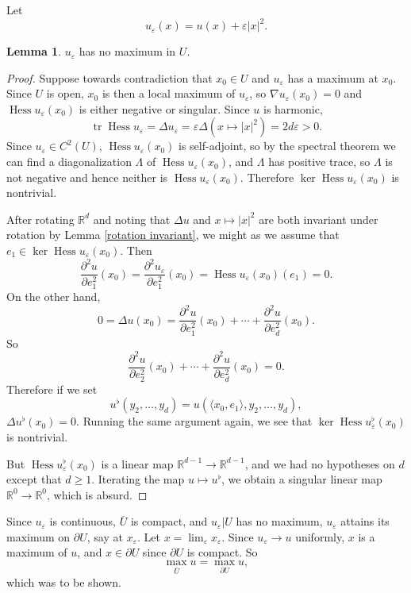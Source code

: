 \documentclass[10pt]{article}
\newcommand{\RR}{\mathbb{R}}
\newcommand{\Hess}{\operatorname{Hess}}
\DeclareMathOperator{\tr}{tr}
\theoremstyle{definition}
\newtheorem{lemma}{Lemma}[exer]
\begin{document}
Let
$$u_\varepsilon(x) = u(x) + \varepsilon|x|^2.$$
\begin{lemma}
$u_\varepsilon$ has no maximum in $U$.
\end{lemma}
\begin{proof}
Suppose towards contradiction that $x_0 \in U$ and $u_\varepsilon$ has a maximum at $x_0$.
Since $U$ is open, $x_0$ is then a local maximum of $u_\varepsilon$, so $\nabla u_\varepsilon(x_0) = 0$ and $\Hess u_\varepsilon(x_0)$ is either negative or singular.
Since $u$ is harmonic,
$$\tr \Hess u_\varepsilon = \Delta u_\varepsilon = \varepsilon \Delta (x \mapsto |x|^2) = 2d\varepsilon > 0.$$
Since $u_\varepsilon \in C^2(U)$, $\Hess u_\varepsilon(x_0)$ is self-adjoint, so by the spectral theorem we can find a diagonalization $\Lambda$ of $\Hess u_\varepsilon(x_0)$, and $\Lambda$ has positive trace, so $\Lambda$ is not negative and hence neither is $\Hess u_\varepsilon(x_0)$.
Therefore $\ker \Hess u_\varepsilon(x_0)$ is nontrivial.

After rotating $\RR^d$ and noting that $\Delta u$ and $x \mapsto |x|^2$ are both invariant under rotation by Lemma \ref{rotation invariant}, we might as we assume that $e_1 \in \ker \Hess u_\varepsilon(x_0)$. Then
$$\frac{\partial^2 u}{\partial e_1^2}(x_0) = \frac{\partial^2 u_\varepsilon}{\partial e_1^2}(x_0) = \Hess u_\varepsilon(x_0)(e_1) = 0.$$
On the other hand,
$$0 = \Delta u(x_0) = \frac{\partial^2 u}{\partial e_1^2}(x_0) + \cdots + \frac{\partial^2 u}{\partial e_d^2}(x_0).$$
So
$$\frac{\partial^2 u}{\partial e_2^2}(x_0) + \cdots + \frac{\partial^2 u}{\partial e_d^2}(x_0) = 0.$$
Therefore if we set
$$u^\flat(y_2, \dots, y_d) = u(\langle x_0, e_1\rangle, y_2, \dots, y_d),$$
$\Delta u^\flat(x_0) = 0$.
Running the same argument again, we see that $\ker \Hess u_\varepsilon^\flat(x_0)$ is nontrivial.

But $\Hess u_\varepsilon^\flat(x_0)$ is a linear map $\RR^{d-1} \to \RR^{d-1}$, and we had no hypotheses on $d$ except that $d \geq 1$.
Iterating the map $u \mapsto u^\flat$, we obtain a singular linear map $\RR^0 \to \RR^0$, which is absurd.
\end{proof}

Since $u_\varepsilon$ is continuous, $\overline U$ is compact, and $u_\varepsilon|U$ has no maximum, $u_\varepsilon$ attains its maximum on $\partial U$, say at $x_\varepsilon$.
Let $x = \lim_\varepsilon x_\varepsilon$. Since $u_\varepsilon \to u$ uniformly, $x$ is a maximum of $u$, and $x \in \partial U$ since $\partial U$ is compact. So
$$\max_{\overline U} u = \max_{\partial U} u,$$
which was to be shown.
\end{document}
